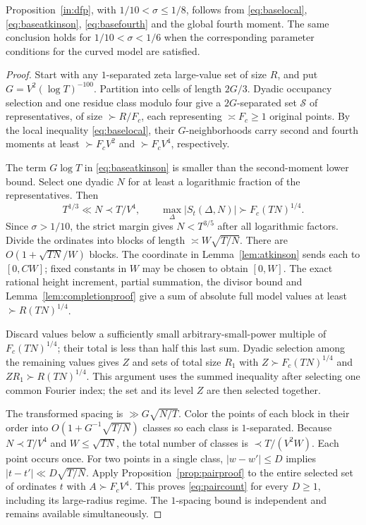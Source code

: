 \begin{proposition}
\label{prop:clusterproof}
Proposition~\ref{in:dfp}, with $1/10<\sigma\le1/8$, follows from
\eqref{eq:baselocal}, \eqref{eq:baseatkinson},
\eqref{eq:basefourth} and the global fourth moment. The same conclusion
holds for $1/10<\sigma<1/6$ when the corresponding parameter conditions
for the curved model are satisfied.
\end{proposition}
\begin{proof}
Start with any $1$-separated zeta large-value set of size $R$, and put
$G=V^2(\log T)^{-100}$. Partition into cells of length $2G/3$.
Dyadic occupancy selection and one residue class modulo four give
a $2G$-separated set $\mathcal S$ of representatives, of size
$\succ R/F_c$, each representing $\asymp F_c\ge1$ original points.
By the local inequality \eqref{eq:baselocal}, their $G$-neighborhoods
carry second and fourth moments at least $\succ F_cV^2$ and
$\succ F_cV^4$, respectively.

The term $G\log T$ in \eqref{eq:baseatkinson} is smaller than the
second-moment lower bound. Select one dyadic $N$ for at least a
logarithmic fraction of the representatives. Then
\[
 T^{1/3}\ll N\prec T/V^4,\qquad
 \max_\Delta|S_t(\Delta,N)|\succ F_c(TN)^{1/4}.
\]
Since $\sigma>1/10$, the strict margin gives $N<T^{3/5}$ after all
logarithmic factors. Divide the ordinates into blocks of length
$\asymp W\sqrt{T/N}$. There are $O(1+\sqrt{TN}/W)$ blocks.
The coordinate in Lemma~\ref{lem:atkinson} sends each to $[0,CW]$;
fixed constants in $W$ may be chosen to obtain $[0,W]$.
The exact rational height increment, partial summation, the divisor
bound and Lemma~\ref{lem:completionproof} give a sum of absolute full
model values at least $\succ R(TN)^{1/4}$.

Discard values below a sufficiently small arbitrary-small-power
multiple of $F_c(TN)^{1/4}$; their total is less than half this last
sum. Dyadic selection among the remaining values gives $Z$ and sets
of total size $R_1$ with $Z\succ F_c(TN)^{1/4}$ and
$ZR_1\succ R(TN)^{1/4}$. This argument uses the summed inequality after selecting one common
Fourier index; the set and its level $Z$ are then selected together.

The transformed spacing is $\gg G\sqrt{N/T}$. Color the points of
each block in their order into $O(1+G^{-1}\sqrt{T/N})$ classes so each
class is $1$-separated. Because $N\prec T/V^4$ and $W\le\sqrt{TN}$,
the total number of classes is $\prec T/(V^2W)$.
Each point occurs once. For two points in a single class,
$|w-w'|\le D$ implies $|t-t'|\ll D\sqrt{T/N}$.
Apply Proposition~\ref{prop:pairproof} to the entire selected set of
ordinates $t$ with $A\succ F_cV^4$.
This proves \eqref{eq:paircount} for every $D\ge1$, including its
large-radius regime. The $1$-spacing bound is independent and remains
available simultaneously.
\end{proof}

